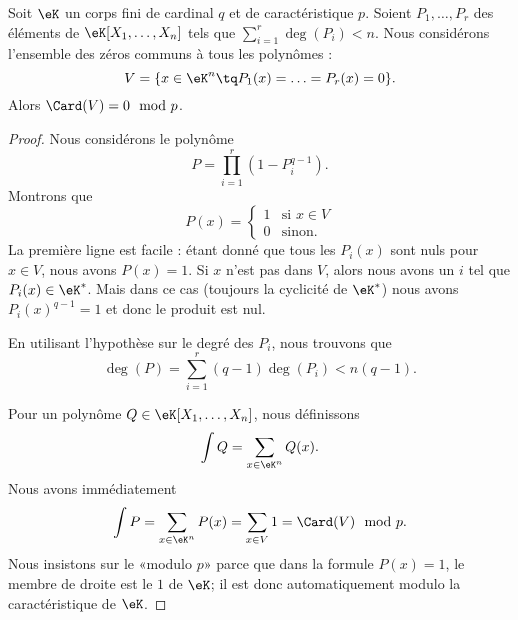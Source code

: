 \begin{theorem}        \label{ThoLTcYKk}
    Soit \( \eK\) un corps fini de cardinal \( q\) et de caractéristique \( p\). Soient \( P_1,\ldots, P_r\) des éléments de \( \eK[X_1,\ldots, X_n]\) tels que \( \sum_{i=1}^r\deg(P_i)<n\). Nous considérons l'ensemble des zéros communs à tous les polynômes :
    \begin{equation}
        V=\{ x\in \eK^n\tq P_1(x)=\ldots=P_r(x)=0 \}.
    \end{equation}
    Alors \( \Card(V)=0\mod p\).
\end{theorem}

\begin{proof}
    Nous considérons le polynôme
    \begin{equation}
        P=\prod_{i=1}^r(1-P_i^{q-1}).
    \end{equation}
    Montrons que
    \begin{equation}
        P(x)=\begin{cases}
            1    &   \text{si } x\in V\\
            0    &    \text{sinon}.
        \end{cases}
    \end{equation}
    La première ligne est facile : étant donné que tous les \( P_i(x)\) sont nuls pour \( x\in V\), nous avons \( P(x)=1\). Si \( x\) n'est pas dans \( V\), alors nous avons un \( i\) tel que \( P_i(x)\in \eK^*\). Mais dans ce cas (toujours la cyclicité de \( \eK^*\)) nous avons \( P_i(x)^{q-1}=1\) et donc le produit est nul.

    En utilisant l'hypothèse sur le degré des \( P_i\), nous trouvons que
    \begin{equation}
        \deg(P)=\sum_{i=1}^r(q-1)\deg(P_i)<n(q-1).
    \end{equation}

    Pour un polynôme \( Q\in \eK[X_1,\ldots, X_n]\), nous définissons
    \begin{equation}
        \int Q=\sum_{x\in \eK^n}Q(x).
    \end{equation}
    Nous avons immédiatement
    \begin{equation}
        \int P=\sum_{x\in \eK^n}P(x)=\sum_{x\in V}1=\Card(V)\mod p.
    \end{equation}
    Nous insistons sur le «modulo \( p\)» parce que dans la formule \( P(x)=1\), le membre de droite est le \( 1\) de \( \eK\); il est donc automatiquement modulo la caractéristique de \( \eK\).


\end{proof}
